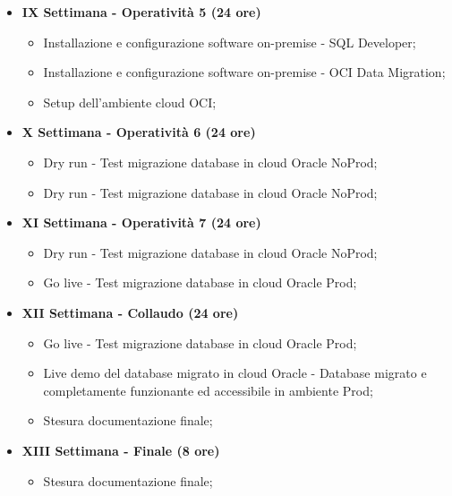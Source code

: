 {\begin{itemize}
        \item \textbf{IX Settimana - Operatività 5 (24 ore)} 
        \begin{itemize}
            \item Installazione e configurazione software on-premise - SQL Developer;
            \item Installazione e configurazione software on-premise - OCI Data Migration;
            \item Setup dell'ambiente cloud OCI;
        \end{itemize}

        \item \textbf{X Settimana - Operatività 6 (24 ore)} 
        \begin{itemize}
            \item Dry run - Test migrazione database in cloud Oracle NoProd;
            \item Dry run - Test migrazione database in cloud Oracle NoProd;
        \end{itemize}

        \item \textbf{XI Settimana - Operatività 7 (24 ore)} 
        \begin{itemize}
            \item Dry run - Test migrazione database in cloud Oracle NoProd;
            \item Go live - Test migrazione database in cloud Oracle Prod;
        \end{itemize}

        \item \textbf{XII Settimana - Collaudo (24 ore)} 
        \begin{itemize}
            \item Go live - Test migrazione database in cloud Oracle Prod;
            \item Live demo del database migrato in cloud Oracle - Database migrato e completamente funzionante ed accessibile in ambiente Prod;
            \item Stesura documentazione finale;
        \end{itemize}

        \item \textbf{XIII Settimana - Finale (8 ore)}
        \begin{itemize}
            \item Stesura documentazione finale;
        \end{itemize}
    \end{itemize}


}

